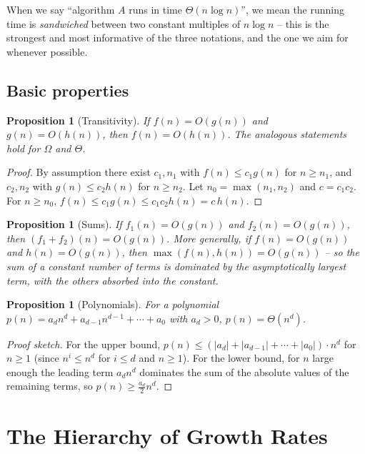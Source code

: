 \documentclass[11pt]{article}
\newtheorem{proposition}[theorem]{Proposition}
\begin{document}
When we say ``algorithm $A$ runs in time $\Theta(n \log n)$'', we mean the running time is
\emph{sandwiched} between two constant multiples of $n \log n$ -- this is the strongest and
most informative of the three notations, and the one we aim for whenever possible.

\subsection{Basic properties}

\begin{proposition}[Transitivity]
If $f(n) = O(g(n))$ and $g(n) = O(h(n))$, then $f(n) = O(h(n))$. The analogous statements
hold for $\Omega$ and $\Theta$.
\end{proposition}
\begin{proof}
By assumption there exist $c_1, n_1$ with $f(n) \le c_1 g(n)$ for $n \ge n_1$, and $c_2,
n_2$ with $g(n) \le c_2 h(n)$ for $n \ge n_2$. Let $n_0 = \max(n_1, n_2)$ and $c = c_1 c_2$.
For $n \ge n_0$, $f(n) \le c_1 g(n) \le c_1 c_2 h(n) = c\,h(n)$.
\end{proof}

\begin{proposition}[Sums]
If $f_1(n) = O(g(n))$ and $f_2(n) = O(g(n))$, then $(f_1+f_2)(n) = O(g(n))$. More generally,
if $f(n) = O(g(n))$ and $h(n) = O(g(n))$, then $\max(f(n), h(n)) = O(g(n))$ -- so the sum of
a constant number of terms is dominated by the asymptotically largest term, with the
others absorbed into the constant.
\end{proposition}

\begin{proposition}[Polynomials]
For a polynomial $p(n) = a_d n^d + a_{d-1} n^{d-1} + \cdots + a_0$ with $a_d > 0$,
$p(n) = \Theta(n^d)$.
\end{proposition}
\begin{proof}[Proof sketch]
For the upper bound, $p(n) \le (|a_d| + |a_{d-1}| + \cdots + |a_0|) \cdot n^d$ for $n \ge 1$
(since $n^i \le n^d$ for $i \le d$ and $n \ge 1$). For the lower bound, for $n$ large enough
the leading term $a_d n^d$ dominates the sum of the absolute values of the remaining terms,
so $p(n) \ge \frac{a_d}{2} n^d$.
\end{proof}

\section{The Hierarchy of Growth Rates}
\end{document}
